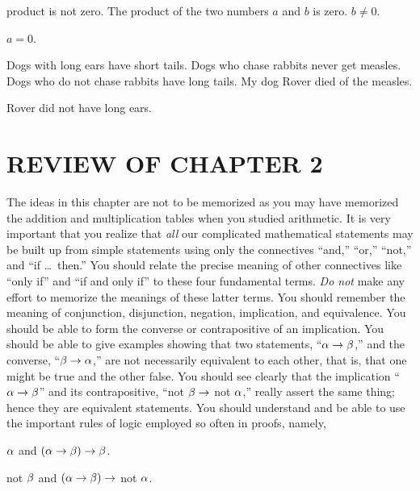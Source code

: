\documentclass[11pt]{book}
\begin{document}
\begin{exercisecols}
\begin{exlist}
\begin{hyp}
      product is not zero. The product of the two numbers $a$ and $b$ is zero.
      $b \neq 0$.\end{hyp}
      \begin{thmclaim}$a = 0$.\end{thmclaim}
\item[\stex 20.] \begin{hyp}Dogs with long ears have short tails. Dogs who chase
      rabbits never get measles. Dogs who do not chase rabbits have long tails. My
      dog Rover died of the measles.\end{hyp}
      \begin{thmclaim}Rover did not have long ears.\end{thmclaim}
\end{exlist}
\end{exercisecols}

\section*{REVIEW OF CHAPTER 2}

The ideas in this chapter are not to be memorized as you may have memorized the
addition and multiplication tables when you studied arithmetic. It is very
important that you realize that \emph{all} our complicated mathematical statements
may be built up from simple statements using only the connectives ``and,'' ``or,''
``not,'' and ``if \dots\ then.'' You should relate the precise meaning of other
connectives like ``only if'' and ``if and only if'' to these four fundamental
terms. \emph{Do not} make any effort to memorize the meanings of these latter
terms. You should remember the meaning of conjunction, disjunction, negation,
implication, and equivalence. You should be able to form the converse or
contrapositive of an implication. You should be able to give examples showing that
two statements, ``$\alpha \rightarrow \beta$,'' and the converse, ``$\beta \rightarrow \alpha$,'' are not
necessarily equivalent to each other, that is, that one might be true and the
other false. You should see clearly that the implication ``$\alpha \rightarrow \beta$'' and its
contrapositive, ``not $\beta \rightarrow$ not $\alpha$,'' really assert the same thing; hence
they are equivalent statements. You should understand and be able to use the
important rules of logic employed so often in proofs, namely,

\begin{exlist}
\item $\alpha$ and $(\alpha \rightarrow \beta) \rightarrow \beta$.
\item not $\beta$ and $(\alpha \rightarrow \beta) \rightarrow$ not $\alpha$.
\end{exlist}
\end{document}
